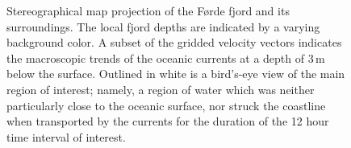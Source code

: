 \begin{figure}[htpb]
    \centering
    \caption[Stereographical map projection of the Førde fjord and its
    surroundings]
    {Stereographical map projection of the Førde fjord and its surroundings.
        The local fjord depths are indicated by a varying background color. A
        subset of the gridded velocity vectors indicates the macroscopic trends
        of the oceanic currents at a depth of $3\,\si{\meter}$ below the
        surface. Outlined in white is a bird's-eye view of the main region of
        interest; namely, a region of water which was neither particularly
        close to the oceanic surface, nor struck the coastline when transported
        by the currents for the duration of the 12 hour time interval of
    interest.}
    \label{fig:currentmap}
\end{figure}

